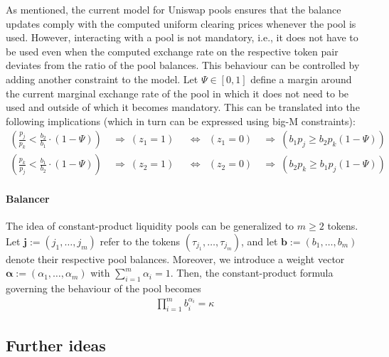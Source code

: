 \documentclass[11pt,parskip=full]{scrartcl}%
\newcommand*{\ie}{i.e., }
\newcommand*{\token}{\tau}                  %
\begin{document}
As mentioned, the current model for Uniswap pools ensures that the balance updates comply with the computed uniform clearing prices whenever the pool is used.
However, interacting with a pool is not mandatory, \ie it does not have to be used even when the computed exchange rate on the respective token pair deviates from the ratio of the pool balances.
This behaviour can be controlled by adding another constraint to the model.
Let $\Psi \in [0,1]$ define a margin around the current marginal exchange rate of the pool in which it does not need to be used and outside of which it becomes mandatory.
This can be translated into the following implications (which in turn can be expressed using big-M constraints):
\begin{subequations}
  \begin{align}
    \left(\frac{p_j}{p_k} < \frac{b_2}{b_1} \cdot (1-\Psi)\right)
    \ &\Rightarrow \
    (z_1 = 1)
    &&\Leftrightarrow &
    (z_1 = 0) \ &\Rightarrow \ \left(b_1 p_j \ge b_2 p_k (1-\Psi)\right)
    \\[1mm]
    \left(\frac{p_k}{p_j} < \frac{b_1}{b_2} \cdot (1-\Psi)\right)
    \ &\Rightarrow \
    (z_2 = 1)
    &&\Leftrightarrow &
    (z_2 = 0) \ &\Rightarrow \ \left(b_2 p_k \ge b_1 p_j (1-\Psi)\right)
  \end{align}
\end{subequations}

\paragraph{Balancer}

The idea of constant-product liquidity pools can be generalized to $m \ge 2$ tokens.
Let $\mathbf{j} := (j_1, \ldots, j_m)$ refer to the tokens $(\token_{j_1}, \ldots, \token_{j_m})$, and let $\mathbf{b} := (b_1, \ldots, b_m)$ denote their respective pool balances.
Moreover, we introduce a weight vector $\bm{\alpha} := (\alpha_1, \ldots, \alpha_m)$ with $\sum_{i=1}^m \alpha_i = 1$.
Then, the constant-product formula governing the behaviour of the pool becomes
\begin{align}
  \prod_{i=1}^m b_i^{\alpha_i} = \kappa
\end{align}

\newpage
\subsection{Further ideas}
\end{document}
